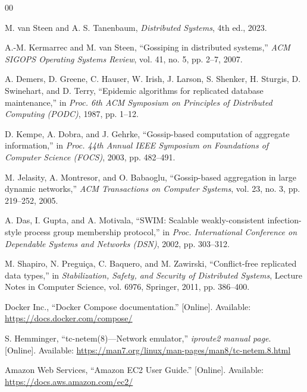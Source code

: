 \documentclass[conference]{IEEEtran}
\begin{document}
\begin{thebibliography}{00}

M. van Steen and A. S. Tanenbaum,
\emph{Distributed Systems}, 4th ed., 2023.

A.-M. Kermarrec and M. van Steen,
``Gossiping in distributed systems,''
\emph{ACM SIGOPS Operating Systems Review},
vol. 41, no. 5, pp. 2--7, 2007.

A. Demers, D. Greene, C. Hauser, W. Irish, J. Larson, S. Shenker,
H. Sturgis, D. Swinehart, and D. Terry,
``Epidemic algorithms for replicated database maintenance,''
in \emph{Proc. 6th ACM Symposium on Principles of Distributed Computing (PODC)},
1987, pp. 1--12.

D. Kempe, A. Dobra, and J. Gehrke,
``Gossip-based computation of aggregate information,''
in \emph{Proc. 44th Annual IEEE Symposium on Foundations of Computer Science (FOCS)},
2003, pp. 482--491.

M. Jelasity, A. Montresor, and O. Babaoglu,
``Gossip-based aggregation in large dynamic networks,''
\emph{ACM Transactions on Computer Systems},
vol. 23, no. 3, pp. 219--252, 2005.

A. Das, I. Gupta, and A. Motivala,
``SWIM: Scalable weakly-consistent infection-style process group membership protocol,''
in \emph{Proc. International Conference on Dependable Systems and Networks (DSN)},
2002, pp. 303--312.

M. Shapiro, N. Preguiça, C. Baquero, and M. Zawirski,
``Conflict-free replicated data types,''
in \emph{Stabilization, Safety, and Security of Distributed Systems},
Lecture Notes in Computer Science, vol. 6976,
Springer, 2011, pp. 386--400.

Docker Inc.,
``Docker Compose documentation.''
[Online]. Available: \url{https://docs.docker.com/compose/}

S. Hemminger,
``tc-netem(8)---Network emulator,''
\emph{iproute2 manual page}.
[Online]. Available: \url{https://man7.org/linux/man-pages/man8/tc-netem.8.html}

Amazon Web Services,
``Amazon EC2 User Guide.''
[Online]. Available: \url{https://docs.aws.amazon.com/ec2/}

\end{thebibliography}
\end{document}
